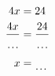 \documentclass[varwidth]{standalone}
\begin{document}
    \begin{varwidth}{0.25\paperwidth}
    \begin{align*}
    4x &= 24\\
    \frac{4x}{\dotuline{\hspace{4mm}}} &= \frac{24}{\dotuline{\hspace{4mm}}}\\
    x &= \dotuline{\hspace{4mm}}\\
\end{align*}
\end{varwidth}
\end{document}
